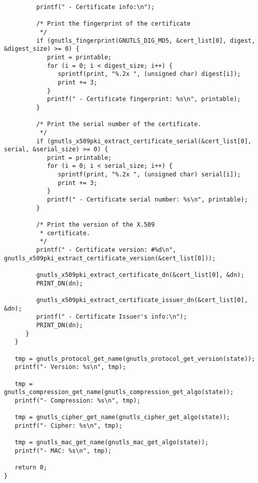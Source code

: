 \begin{verbatim}
         printf(" - Certificate info:\n");

         /* Print the fingerprint of the certificate
          */
         if (gnutls_fingerprint(GNUTLS_DIG_MD5, &cert_list[0], digest, &digest_size) >= 0) {
            print = printable;
            for (i = 0; i < digest_size; i++) {
               sprintf(print, "%.2x ", (unsigned char) digest[i]);
               print += 3;
            }
            printf(" - Certificate fingerprint: %s\n", printable);
         }

         /* Print the serial number of the certificate.
          */
         if (gnutls_x509pki_extract_certificate_serial(&cert_list[0], serial, &serial_size) >= 0) {
            print = printable;
            for (i = 0; i < serial_size; i++) {
               sprintf(print, "%.2x ", (unsigned char) serial[i]);
               print += 3;
            }
            printf(" - Certificate serial number: %s\n", printable);
         }

         /* Print the version of the X.509 
          * certificate.
          */
         printf(" - Certificate version: #%d\n", gnutls_x509pki_extract_certificate_version(&cert_list[0]));

         gnutls_x509pki_extract_certificate_dn(&cert_list[0], &dn);
         PRINT_DN(dn);

         gnutls_x509pki_extract_certificate_issuer_dn(&cert_list[0], &dn);
         printf(" - Certificate Issuer's info:\n");
         PRINT_DN(dn);
      }
   }

   tmp = gnutls_protocol_get_name(gnutls_protocol_get_version(state));
   printf("- Version: %s\n", tmp);

   tmp = gnutls_compression_get_name(gnutls_compression_get_algo(state));
   printf("- Compression: %s\n", tmp);

   tmp = gnutls_cipher_get_name(gnutls_cipher_get_algo(state));
   printf("- Cipher: %s\n", tmp);

   tmp = gnutls_mac_get_name(gnutls_mac_get_algo(state));
   printf("- MAC: %s\n", tmp);

   return 0;
}

\end{verbatim}
